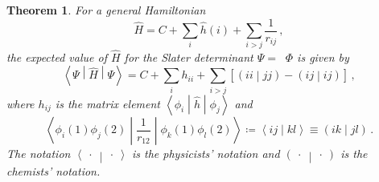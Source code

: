 \documentclass{article}
\theoremstyle{plain}\theoremheaderfont{\normalfont\itshape}\theorembodyfont{\rmfamily}\theoremseparator{.}\newtheorem*{rem}{Remark}\newtheorem*{ex}{Example}\newtheorem*{proof}{Proof}\newtheorem*{altp}{Alternative proof}
\theoremstyle{plain}\theoremheaderfont{\normalfont\bfseries}\theorembodyfont{\rmfamily}\theoremseparator{.}\newtheorem{thm}{Theorem}[section]\newtheorem{lem}[thm]{Lemma}\newtheorem{prop}[thm]{Proposition}\newtheorem*{cor}{Corollary}\newtheorem{defn}[thm]{Definition}\newtheorem{clm}[thm]{Claim}\newtheorem{clminproof}{Claim}
\theoremstyle{break}\theoremheaderfont{\normalfont\itshape}\theorembodyfont{\rmfamily}\theoremseparator{.\medskip}\newtheorem*{proofskip}{Proof}\newtheorem*{exs}{Examples}\newtheorem*{rems}{Remarks}
\theoremstyle{break}\theoremheaderfont{\normalfont\bfseries}\theorembodyfont{\rmfamily}\theoremseparator{.\medskip}\newtheorem{lemskip}[thm]{Lemma}\newtheorem{defnskip}[thm]{Definition}\newtheorem{propskip}[thm]{Proposition}\newtheorem{thmskip}[thm]{Theorem}
\numberwithin{equation}{section}
\newcommand{\braket}[2]{\left\langle #1 \middle| #2 \right\rangle}
\newcommand{\mel}[3]{\left\langle #1 \middle| #2 \middle| #3 \right\rangle}
\newcommand{\expval}[2]{\left\langle #2 \middle| #1 \middle| #2 \right\rangle}
\newcommand{\bracket}[2]{\left( #1 \middle| #2 \right)}
\DeclareMathOperator{\antisymm}{\hat{\mathcal{A}}}
\begin{document}
    \begin{thm}\label{HF_Hamiltonian_expval}
        For a general Hamiltonian
        \begin{equation}
            \hat{H}=C+\sum_i \hat{h}(i)+\sum_{i>j}\frac{1}{r_{ij}}\,,
        \end{equation}
        the expected value of \(\hat{H}\) for the Slater determinant \(\Psi=\antisymm\Phi\) is given by
        \begin{equation}
            \expval{\hat{H}}{\Psi}=C+\sum_{i}h_{ii}+\sum_{i>j}[\bracket{ii}{jj}-\bracket{ij}{ij}]\,,
        \end{equation}
        where \(h_{ij}\) is the matrix element \(\mel{\phi_i}{\hat{h}}{\phi_j}\) and
        \begin{equation}
            \mel{\phi_i(1)\phi_j(2)}{\frac{1}{r_{12}}}{\phi_k(1)\phi_l(2)}\coloneqq\braket{ij}{kl}\equiv\bracket{ik}{jl}\,.
        \end{equation}
        The notation \(\braket{\ \cdot \ }{\ \cdot \ }\) is the \textit{physicists' notation} and \(\bracket{\ \cdot \ }{\ \cdot \ }\) is the \textit{chemists' notation}.
    \end{thm}
\end{document}
